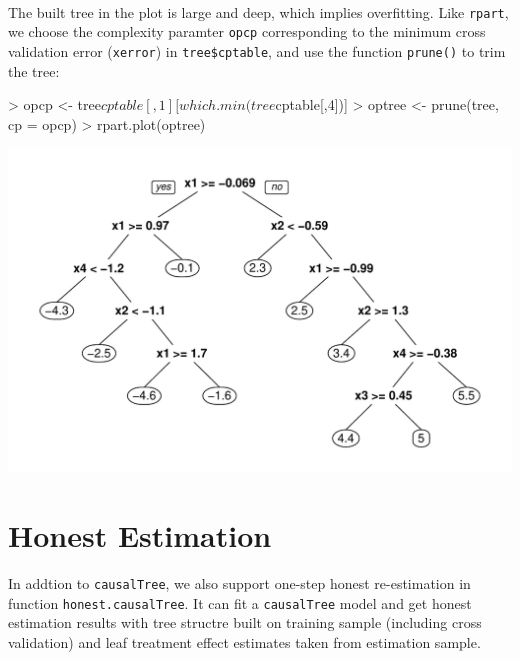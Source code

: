 \documentclass[11pt]{article}
\renewenvironment{Schunk}{\vspace{\topsep}}{\vspace{\topsep}}
\begin{document}
\\
The built tree in the plot is large and deep, which implies overfitting. Like \texttt{rpart}, we choose the complexity paramter \texttt{opcp} corresponding to the minimum cross validation error (\texttt{xerror}) in \texttt{tree\$cptable}, and use the function \texttt{prune()} to trim the tree: 
\begin{Schunk}
\begin{Sinput}
> opcp <- tree$cptable[, 1][which.min(tree$cptable[,4])]
> optree <- prune(tree, cp = opcp)
> rpart.plot(optree)
\end{Sinput}
\end{Schunk}
\includegraphics{briefintro-prune}
\section{Honest Estimation}
In addtion to \texttt{causalTree}, we also support one-step honest re-estimation in function \texttt{honest.causalTree}. It can fit a \texttt{causalTree} model and get honest estimation results with tree structre built on training sample (including cross validation) and leaf treatment effect estimates taken from estimation sample.
\end{document}
